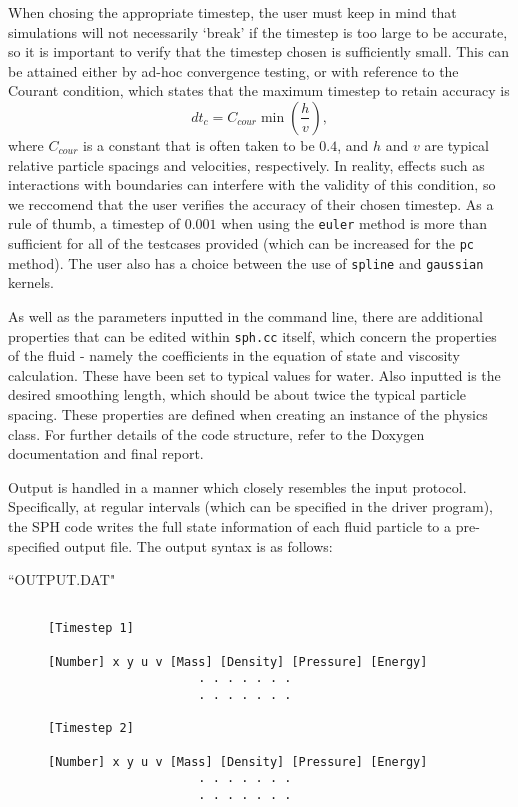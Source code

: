\documentclass[12pt]{article}
\begin{document}
When chosing the appropriate timestep, the user must keep in mind that simulations will not necessarily `break' if the timestep is too large to be accurate, so it is important to verify that the timestep chosen is sufficiently small. This can be attained either by ad-hoc convergence testing, or with reference to the Courant condition, which states that the maximum timestep to retain accuracy is 
$$ dt_c = C_{cour} \min\left(\frac{h}{v}\right),$$
where $C_{cour}$ is a constant that is often taken to be  $0.4$, and $h$ and $v$ are typical relative particle spacings and velocities, respectively. In reality, effects such as interactions with boundaries can interfere with the validity of this condition, so we reccomend that the user verifies the accuracy of their chosen timestep. As a rule of thumb, a timestep of $0.001$ when using the \texttt{euler} method is more than sufficient for all of the testcases provided (which can be increased for the \texttt{pc} method). The user also has a choice between the use of \texttt{spline} and \texttt{gaussian} kernels.

As well as the parameters inputted in the command line, there are additional properties that can be edited within \texttt{sph.cc} itself, which concern the properties of the fluid - namely the coefficients in the equation of state and viscosity calculation. These have been set to typical values for water. Also inputted is the desired smoothing length, which should be about twice the typical particle spacing. These properties are defined when creating an instance of the physics class. For further details of the code structure, refer to the Doxygen documentation and final report.

Output is handled in a manner which closely resembles the input protocol. Specifically, at regular intervals (which can be specified in the driver program), the SPH code writes the full state information of each fluid particle to a pre-specified output file. The output syntax is as follows:

\begin{description}
	\item[``OUTPUT.DAT"]
		\begin{verbatim}

[Timestep 1]

[Number] x y u v [Mass] [Density] [Pressure] [Energy]
                     . . . . . . .
                     . . . . . . .

[Timestep 2]

[Number] x y u v [Mass] [Density] [Pressure] [Energy]
                     . . . . . . .
                     . . . . . . .
		\end{verbatim}
\end{description}
	
\end{document}
